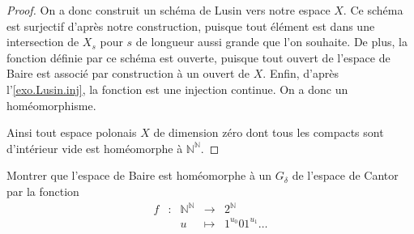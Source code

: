 \begin{proof}
  On a donc construit un schéma de Lusin vers notre espace $X$. Ce schéma est
  surjectif d'après notre construction, puisque tout élément est dans une
  intersection de $X_s$ pour $s$ de longueur aussi grande que l'on souhaite.
  De plus, la fonction définie par ce schéma est ouverte, puisque tout ouvert de
  l'espace de Baire est associé par construction à un ouvert de $X$. Enfin,
  d'après l'\cref{exo.Lusin.inj}, la fonction est une injection continue. On
  a donc un homéomorphisme.

  Ainsi tout espace polonais $X$ de dimension zéro dont tous les compacts sont
  d'intérieur vide est homéomorphe à $\mathbb N^\mathbb N$.
\end{proof}

\begin{exercise}
  Montrer que l'espace de Baire est homéomorphe à un $G_\delta$ de l'espace de
  Cantor par la fonction
  \[\begin{array}{ccccc}
  f & : & \mathbb N^\mathbb N & \longrightarrow & 2^\mathbb N\\
  & & u & \longmapsto & 1^{u_0}01^{u_1}\ldots
  \end{array}\]
\end{exercise}
